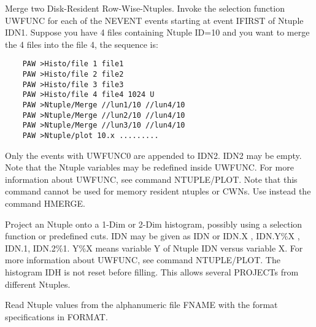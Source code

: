    \par
Merge two Disk-Resident Row-Wise-Ntuples.  Invoke the selection function 
   UWFUNC for each of the NEVENT events starting at event IFIRST of Ntuple 
   IDN1.  Suppose you have 4 files containing Ntuple ID=10 and you want to 
   merge the 4 files into the file 4, the sequence is:  
\begin{verbatim}
    PAW >Histo/file 1 file1
    PAW >Histo/file 2 file2
    PAW >Histo/file 3 file3
    PAW >Histo/file 4 file4 1024 U
    PAW >Ntuple/Merge //lun1/10 //lun4/10
    PAW >Ntuple/Merge //lun2/10 //lun4/10
    PAW >Ntuple/Merge //lun3/10 //lun4/10
    PAW >Ntuple/plot 10.x .........
\end{verbatim}
   \par
Only the events with UWFUNC\KET{}0 are appended to IDN2. IDN2 may be empty. 
   Note that the Ntuple variables may be redefined inside UWFUNC.  For more 
   information about UWFUNC, see command NTUPLE/PLOT.  Note that this command 
   cannot be used for memory resident ntuples or CWNs.  Use instead the 
   command HMERGE.  

\ENDCMD


\BEGARG
{}
\ENDARG

   \par
Project an Ntuple onto a 1-Dim or 2-Dim histogram, possibly using a 
   selection function or predefined cuts.  IDN may be given as IDN or IDN.X , 
   IDN.Y\%X , IDN.1, IDN.2\%1.  Y\%X means variable Y of Ntuple IDN versus 
   variable X.  For more information about UWFUNC, see command NTUPLE/PLOT.  
   The histogram IDH is not reset before filling. This allows several PROJECTs 
   from different Ntuples.  

\ENDCMD


\BEGARG
{}
\ENDARG

   \par
Read Ntuple values from the alphanumeric file FNAME with the format 
   specifications in FORMAT.  

